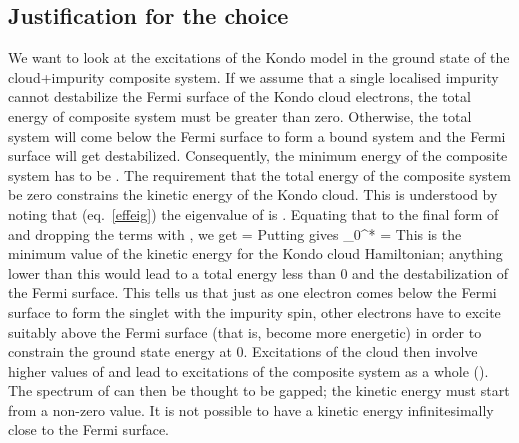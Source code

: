 \documentclass[14pt]{extarticle}
\numberwithin{equation}{section}
\begin{document}
\subsection*{Justification for the choice }
We want to look at the excitations of the Kondo model in the ground state of the cloud+impurity composite system. If we assume that a single localised impurity cannot destabilize the Fermi surface of the Kondo cloud electrons, the total energy of composite system must be greater than zero. Otherwise, the total system will come below the Fermi surface to form a bound system and the Fermi surface will get destabilized. Consequently, the minimum energy of the composite system has to be .
\pb
The requirement that the total energy of the composite system be zero constrains the kinetic energy of the Kondo cloud. This is understood by noting that (eq.~\ref{effeig}) the eigenvalue of  is . Equating that to the final form of  and dropping the terms with , we get
\beq
{}\ket{\Uparrow} =\ket{\Uparrow}
\eeq
Putting  gives
\beq
\ham_0^* \ket{\Uparrow} = \ket{\Uparrow}
\eeq
This is the minimum value of the kinetic energy for the Kondo cloud Hamiltonian; anything lower than this would lead to a total energy  less than 0 and the destabilization of the Fermi surface. This tells us that just as one electron comes below the Fermi surface to form the singlet with the impurity spin, other electrons have to excite suitably above the Fermi surface (that is, become more energetic) in order to constrain the ground state energy at 0. Excitations of the cloud then involve higher values of  and lead to excitations of the composite system as a whole (). The spectrum of  can then be thought to be gapped; the kinetic energy must start from a non-zero value. It is not possible to have a kinetic energy infinitesimally close to the Fermi surface.
\end{document}

